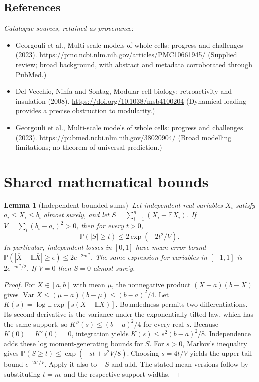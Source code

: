 \documentclass[11pt]{article}
\newcommand{\E}{\mathbb E}
\newcommand{\Prob}{\mathbb P}
\DeclareMathOperator{\Var}{Var}
\providecommand{\E}{\mathbb E}
\providecommand{\Prob}{\mathbb P}
\providecommand{\Var}{\operatorname{Var}}
\newtheorem{sharedlemma}{Lemma}[section]
\begin{document}
\subsection{References}
\noindent\emph{Catalogue sources, retained as provenance:}
\begin{itemize}
\item Georgouli et al., Multi-scale models of whole cells: progress and challenges (2023). \url{https://pmc.ncbi.nlm.nih.gov/articles/PMC10661945/} (Supplied review; broad background, with abstract and metadata corroborated through PubMed.)
\item Del Vecchio, Ninfa and Sontag, Modular cell biology: retroactivity and insulation (2008). \url{https://doi.org/10.1038/msb4100204} (Dynamical loading provides a precise obstruction to modularity.)
\item Georgouli et al., Multi-scale models of whole cells: progress and challenges (2023). \url{https://pubmed.ncbi.nlm.nih.gov/38020904/} (Broad modelling limitations; no theorem of universal prediction.)
\end{itemize}
\clearpage


\appendix
\section{Shared mathematical bounds}\label{app:bounds}
\begin{sharedlemma}[Independent bounded sums]\label{lem:bounded}
Let independent real variables $X_i$ satisfy $a_i\leq X_i\leq b_i$ almost surely,
and let $S=\sum_{i=1}^n(X_i-\E X_i)$. If
$V=\sum_i(b_i-a_i)^2>0$, then for every $t>0$,
\[
 \Prob(|S|\geq t)\leq 2\exp(-2t^2/V).
\]
In particular, independent losses in $[0,1]$ have mean-error bound
$\Prob(|\overline X-\E\overline X|\geq\epsilon)
\leq2e^{-2n\epsilon^2}$. The same expression for variables in $[-1,1]$
is $2e^{-n\epsilon^2/2}$. If $V=0$ then $S=0$ almost surely.
\end{sharedlemma}
\begin{proof}
For $X\in[a,b]$ with mean $\mu$, the nonnegative product
$(X-a)(b-X)$ gives
$\Var X\leq(\mu-a)(b-\mu)\leq(b-a)^2/4$.
Let $K(s)=\log\E\exp[s(X-\E X)]$.
Boundedness permits two differentiations. Its second derivative is the variance
under the exponentially tilted law, which has the same support, so
$K''(s)\leq(b-a)^2/4$ for every real $s$.
Because $K(0)=K'(0)=0$, integration yields
$K(s)\leq s^2(b-a)^2/8$.
Independence adds these log moment-generating bounds for $S$.
For $s>0$, Markov's inequality gives
$\Prob(S\geq t)\leq\exp(-st+s^2V/8)$.
Choosing $s=4t/V$ yields the upper-tail bound $e^{-2t^2/V}$.
Apply it also to $-S$ and add. The stated mean versions follow by substituting
$t=n\epsilon$ and the respective support widths.
\end{proof}
\end{document}
